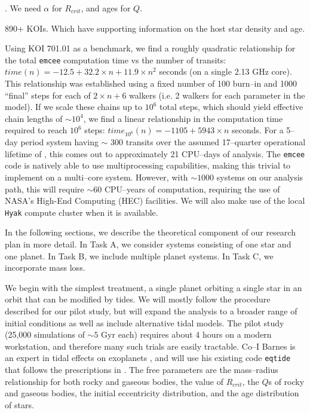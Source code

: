\medskip
{\centerline{}}
\smallskip

.  We need $\alpha$ for $R_{crit}$, and ages for $Q$.

890+ KOIs.  Which have supporting information on the host star density
and age.

\medskip
{\centerline{}}
\smallskip

Using KOI 701.01 as a benchmark, we find a roughly quadratic
relationship for the total {\tt emcee} computation time vs the number
of transits: $time(n) = -12.5 + 32.2 \times n + 11.9 \times n^2$
seconds (on a single 2.13 GHz core).  This relationship was
established using a fixed number of 100 burn--in and 1000 ``final''
steps for each of $2 \times n + 6$ walkers (i.e. 2 walkers for each
parameter in the model).  If we scale these chains up to $10^6$ total
steps, which should yield effective chain lengths of $\sim 10^4$, we
find a linear relationship in the computation time required to reach
$10^6$ steps: $time_{10^6}(n) = -1105 + 5943 \times n$ seconds.  For a
5--day period system having $\sim$ 300 transits over the assumed
17--quarter operational lifetime of \kepler, this comes out to
approximately 21 CPU--days of analysis.  The {\tt emcee} code is
natively able to use multiprocessing capabilities, making this trivial
to implement on a multi--core system.  However, with $\sim 1000$
systems on our analysis path, this will require $\sim 60$ CPU--years
of computation, requiring the use of NASA's High-End Computing (HEC)
facilities.  We will also make use of the local {\tt Hyak} compute
cluster when it is available.

\medskip
{\centerline{}}
\smallskip

In the following sections, we describe the theoretical component of
our research plan in more detail.  In Task A, we consider systems
consisting of one star and one planet.  In Task B, we include multiple
planet systems. In Task C, we incorporate mass loss.

\medskip
{\centerline{}}
\smallskip

We begin with the simplest treatment, a single planet orbiting a
single star in an orbit that can be modified by tides.  We will mostly
follow the procedure described for our pilot study, but will expand
the analysis to a broader range of initial conditions as well as
include alternative tidal models.  The pilot study (25,000 simulations
of $\sim 5$ Gyr each) requires about 4 hours on a modern workstation,
and therefore many such trials are easily tractable.  Co--I Barnes is
an expert in tidal effects on exoplanets
\citep{Barnes08,Jackson08,Barnes09,Barnes12}, and will use his
existing code \texttt{eqtide} that follows the prescriptions in
\cite{Barnes12}.  The free parameters are the mass--radius
relationship for both rocky and gaseous bodies, the value of
$R_{crit}$, the $Q$s of rocky and gaseous bodies, the initial
eccentricity distribution, and the age distribution of \kepler stars.

